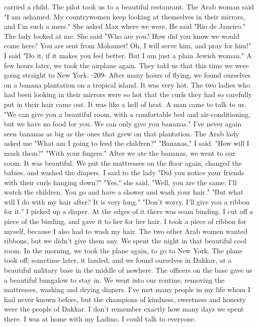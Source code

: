 carried a child.
The pilot took us to a beautiful restaurant.
The 
Arab woman said "I am ashamed.
My countrywomen keep looking at themselves 
in their mirrors, and I'm such a mess."
She asked Max where we were.
He said "Rio de Janeiro."
The lady 
looked at me.
She said "Who are you?
How did you know we would come 
here?
You are sent from Mohamet!
Oh, I will serve him, and pray for 
him!"
I said "Do it, if it makes you feel better.
But I am just a plain 
Jewish woman."
A few hours later, we took the airplane again.
They told us that 
this time we were going straight to New York.
-209- 
After many hours of flying, we found ourselves on a banana plantation on 
a tropical island.
It was very hot.
The two ladies who had been looking 
in their mirrors were so hot that the curls they had so carefully put in 
their hair came out.
It was like a hell of heat.
A man came to talk to 
us.
"We can give you a beautiful room, with a comfortable bed and air-conditioning, 
but we have no food for you.
We can only give you bananas."
I've never again seen bananas as big as the ones that grew on that plantation.
The Arab lady asked me "What am I going to feed the children?"
"Bananas," I said.
"How will I mash them?"
"With your fingers."
After we ate the bananas, we went to our room.
It was beautiful.
We put the mattresses on the floor again, changed the babies, and washed 
the diapers.
I said to the lady "Did you notice your friends with their 
curls hanging down?"
"Yes," she said.
"Well, you are the same: I'll watch the children.
You go and have 
a shower and wash your hair."
"But what will I do with my hair after?
It is very long."
"Don't worry.
I'll give you a ribbon for it."
I picked up a diaper.
At the edges of it there was seam binding.
I 
cut off a piece of the binding, and gave it to her for her hair.
I took 
a piece of ribbon for myself, because I also had to wash my hair.
The 
two other Arab women wanted ribbons, but we didn't give them any.
We spent the night in that beautiful cool room.
In the morning, we 
took the plane again, to go to New York.
The plane took off; sometime 
later, it landed, and we found ourselves in Dakkar, at a beautiful military 
base in the middle of nowhere.
The officers on the base gave us a 
beautiful bungalow to stay in.
We went into our routine, removing the 
mattresses, washing and drying diapers.
I've met many people in my life whom I had never known before, but 
the champions of kindness, sweetness and honesty were the people of 
Dakkar.
I don't remember exactly how many days we spent there.
I was at 
home with my Ladino.
I could talk to everyone.
